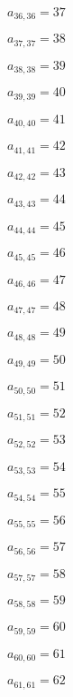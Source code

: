 \documentclass[a4paper,12pt]{article}
\begin{document}
$a _{ 36, 36 } = 37$

$a _{ 37, 37 } = 38$

$a _{ 38, 38 } = 39$

$a _{ 39, 39 } = 40$

$a _{ 40, 40 } = 41$

$a _{ 41, 41 } = 42$

$a _{ 42, 42 } = 43$

$a _{ 43, 43 } = 44$

$a _{ 44, 44 } = 45$

$a _{ 45, 45 } = 46$

$a _{ 46, 46 } = 47$

$a _{ 47, 47 } = 48$

$a _{ 48, 48 } = 49$

$a _{ 49, 49 } = 50$

$a _{ 50, 50 } = 51$

$a _{ 51, 51 } = 52$

$a _{ 52, 52 } = 53$

$a _{ 53, 53 } = 54$

$a _{ 54, 54 } = 55$

$a _{ 55, 55 } = 56$

$a _{ 56, 56 } = 57$

$a _{ 57, 57 } = 58$

$a _{ 58, 58 } = 59$

$a _{ 59, 59 } = 60$

$a _{ 60, 60 } = 61$

$a _{ 61, 61 } = 62$
\end{document}
